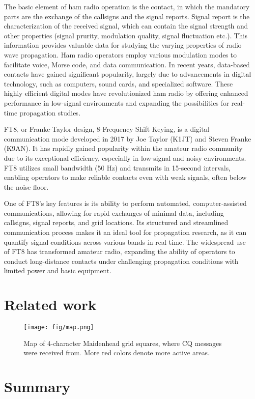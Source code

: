 \documentclass[conference]{IEEEtran}
\begin{document}
The basic element of ham radio operation is the contact, in which the mandatory
parts are the exchange of the callsigns and the signal reports. Signal report
is the characterization of the received signal, which can contain the signal strength
and other properties (signal prurity, modulation quality, signal fluctuation etc.).
This information provides valuable data for studying the varying properties of radio
wave propagation.
Ham radio operators employ various modulation modes to facilitate voice, Morse
code, and data communication. In recent years, data-based contacts have gained
significant popularity, largely due to advancements in digital technology, such
as computers, sound cards, and specialized software. These highly efficient
digital modes have revolutionized ham radio by offering enhanced performance in
low-signal environments and expanding the possibilities for real-time
propagation studies.

FT8, or Franke-Taylor design, 8-Frequency Shift Keying, is a digital
communication mode developed in 2017 by Joe Taylor (K1JT) and Steven Franke
(K9AN). It has rapidly gained popularity within the amateur radio community due
to its exceptional efficiency, especially in low-signal and noisy environments.
FT8 utilizes small bandwidth (50 Hz) and transmits in 15-second intervals,
enabling operators to make reliable contacts even with weak signals, often
below the noise floor.

One of FT8's key features is its ability to perform automated,
computer-assisted communications, allowing for rapid exchanges of minimal data,
including callsigns, signal reports, and grid locations. Its structured and
streamlined communication process makes it an ideal tool for propagation
research, as it can quantify signal conditions across various bands in
real-time. The widespread use of FT8 has transformed amateur radio, expanding
the ability of operators to conduct long-distance contacts under challenging
propagation conditions with limited power and basic equipment.

\cite{ga-vrp}

\section{Related work}

\begin{figure}[htbp]
	\centering
	\texttt{[image: fig/map.png]}
	\caption{Map of 4-character Maidenhead grid squares, where CQ messages were received from.
  More red colors denote more active areas.}
	\label{fig-dummy}
\end{figure}

\section{Summary}




\end{document}
